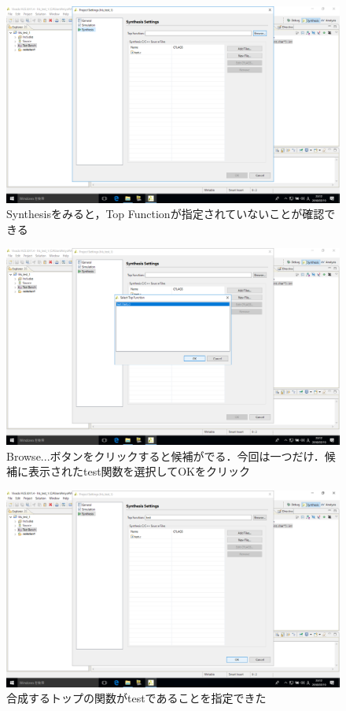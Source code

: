 \documentclass[a4paper,dvipdfmx]{jsarticle}
\begin{document}
 \begin{figure}[H]
  \begin{center}
   \includegraphics[width=.8\textwidth]{chapter08_figures/VirtualBox_Windows10_19_03_2018_23_15_58.png}
  \end{center}
  \caption{Synthesisをみると，Top Functionが指定されていないことが確認できる}
 \end{figure}

 \begin{figure}[H]
  \begin{center}
   \includegraphics[width=.8\textwidth]{chapter08_figures/VirtualBox_Windows10_19_03_2018_23_16_05.png}
  \end{center}
  \caption{Browse...ボタンをクリックすると候補がでる．今回は一つだけ．候補に表示されたtest関数を選択してOKをクリック}
 \end{figure}

 \begin{figure}[H]
  \begin{center}
   \includegraphics[width=.8\textwidth]{chapter08_figures/VirtualBox_Windows10_19_03_2018_23_16_10.png}
  \end{center}
  \caption{合成するトップの関数がtestであることを指定できた}
 \end{figure}
\end{document}
